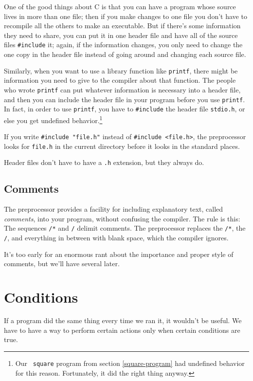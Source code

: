One of the good things about C is that you can have a program whose
source lives in more than one file; then if you make changes to one file
you don't have to recompile all the others to make an executable.  But
if there's some information they need to share, you can put it in one
header file and have all of the source files {\tt \#include} it; again,
if the information changes, you only need to change the one copy in the
header file instead of going around and changing each source file.

Similarly, when you want to use a library function like {\tt printf},
there might be information you need to give to the compiler about that
function.  The people who wrote {\tt printf} can put whatever
information is necessary into a header file, and then you can include
the header file in your program before you use {\tt printf}.  In fact,
in order to use {\tt printf}, you have to {\tt\#include} the header file
{\tt stdio.h}, or else you get undefined behavior.\footnote{Our {\tt
square} program from section \ref{square-program} had undefined behavior
for this reason.  Fortunately, it did the right thing anyway.}

If you write {\tt\#include "file.h"} instead of {\tt\#include <file.h>},
the preprocessor looks for {\tt file.h} in the current directory before
it looks in the standard places.

Header files don't have to have a {\tt .h} extension, but they always
do.

\subsection{Comments}

The preprocessor provides a facility for including explanatory text,
called {\em comments}\/, into your program, without confusing the
compiler.  The rule is this: The sequences {\tt /*} and {\tt */} delimit
comments.  The preprocessor replaces the {\tt /*}, the {\tt */}, and
everything in between with blank space, which the compiler ignores.

It's too early for an enormous rant about the importance and proper
style of comments, but we'll have several later.

\section{Conditions}

If a program did the same thing every time we ran it, it wouldn't be
useful.  We have to have a way to perform certain actions only when
certain conditions are true.

